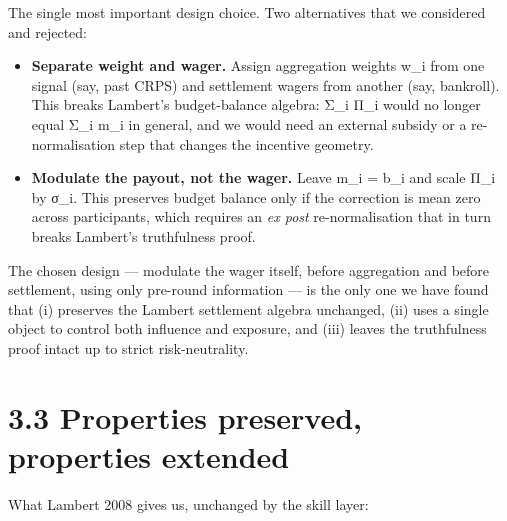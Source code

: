 \documentclass[11pt,a4paper,openany]{report}
\begin{document}
The single most important design choice. Two alternatives that we
considered and rejected:

\begin{itemize}
  \item \textbf{Separate weight and wager.} Assign aggregation weights w\_i from one
    signal (say, past CRPS) and settlement wagers from another (say,
    bankroll). This breaks Lambert's budget-balance algebra: Σ\_i Π\_i
    would no longer equal Σ\_i m\_i in general, and we would need an
    external subsidy or a re-normalisation step that changes the
    incentive geometry.
  \item \textbf{Modulate the payout, not the wager.} Leave m\_i = b\_i and scale Π\_i
    by σ\_i. This preserves budget balance only if the correction is mean
    zero across participants, which requires an \emph{ex post} re-normalisation
    that in turn breaks Lambert's truthfulness proof.
\end{itemize}

The chosen design — modulate the wager itself, before aggregation and
before settlement, using only pre-round information — is the only one
we have found that (i) preserves the Lambert settlement algebra
unchanged, (ii) uses a single object to control both influence and
exposure, and (iii) leaves the truthfulness proof intact up to strict
risk-neutrality.

\section{3.3 Properties preserved, properties extended}

What Lambert 2008 gives us, unchanged by the skill layer:
\end{document}

